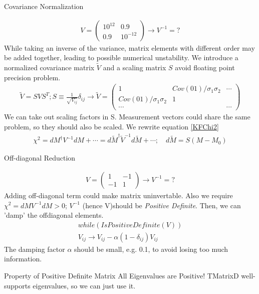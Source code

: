\documentclass[
	xcolor=dvipsnames,
	aspectratio=169,	
	10pt, 
	]{beamer}
\begin{document}
\begin{frame}{Covariance Normalization}
	\begin{block}{}
		\begin{align}
			V =
			 \begin{pmatrix}
				10^{12}&0.9\\
				0.9&10^{-12}
			\end{pmatrix}\to V^{-1} = ?
		\end{align}
		While taking an inverse of the variance, matrix elements with different order may be added together, leading to possible numerical unstability.
		We introduce a normalized covariance matrix $\tilde V$ and a scaling matrix $S$ avoid floating point precision problem. 
		\begin{align}
			\tilde V = S V S^T; S\equiv 
				\frac{1}{\sqrt{V_{ij}}}\delta_{ij}\to \tilde V=\begin{pmatrix}
					1 & Cov(01)/\sigma_{1}\sigma_{2}&\cdots \\
					Cov(01)/\sigma_{1}\sigma_{2}& 1& \\
					\cdots&&\cdots
				\end{pmatrix}
		\end{align}
		We can take out scaling factors in S. Measurement vectors could share the same problem, so they should also be scaled. We rewrite equation \eqref{KFChi2}
		\begin{align}
			\chi^2 = dM^\dagger V^{-1} dM +\cdots= d\tilde M^\dagger \tilde V^{-1}d\tilde M+\cdots;\quad d \tilde M = S(M-M_0) 
		\end{align}
	\end{block}
\end{frame}
\begin{frame}{Off-diagonal Reduction}
	\begin{block}{}
		\begin{align}{}
			V = \begin{pmatrix}
					1&-1\\
					-1&1
			\end{pmatrix}\to V^{-1} = ?
		\end{align}
		Adding off-diagonal term could make matrix uninvertable.  Also we require $\chi^2 = dM V^{-1} dM >0$; $V^{-1}$ (hence V)should be \textit{Positive Definite}. 
		Then, we can 'damp' the offdiagonal elements.
		\begin{align}
			while(IsPositiveDefinite(V))\\
			V_{ij} \to V_{ij}  - \alpha (1 -\delta_{ij}) V_{ij}
		\end{align}
		The damping factor $\alpha$ should be small, e.g. 0.1, to avoid losing too much information.
		\begin{block}{Property of Positive Definite Matrix}
			All Eigenvalues are Positive! TMatrixD well-supports eigenvalues, so we can just use it.
		\end{block}
	\end{block}
\end{frame}
\end{document}
